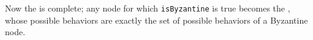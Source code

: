 
Now the \randomHarness{} is complete; any node for which \texttt{isByzantine} is true becomes the \randomSimulator{}, whose possible behaviors are exactly the set of possible behaviors of a Byzantine node.

